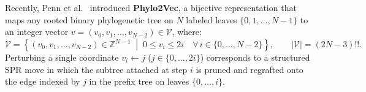 \documentclass[11pt,a4paper]{article}
\makeatletter
\DeclareRobustCommand{\_}{\ifmmode\nfss@text{\textunderscore}\else\textunderscore\allowbreak\fi}
\theoremstyle{definition}
\makeatother
\begin{document}
Recently, Penn et al.~\cite{penn2024phylo2vec} introduced \textbf{Phylo2Vec}, a bijective representation that maps any rooted binary phylogenetic tree on $N$ labeled leaves $\{0, 1, \dots, N-1\}$ to an integer vector $v = (v_0, v_1, \dots, v_{N-2}) \in \mathcal{V}$, where:
\begin{equation}
\mathcal{V} = \left\{ (v_0, v_1, \dots, v_{N-2}) \in \mathbb{Z}^{N-1} \;\middle|\; 0 \le v_i \le 2i \quad \forall \, i \in \{0, \dots, N-2\} \right\}, \qquad |\mathcal{V}| = (2N-3)!!.
\label{eq:phylo2vec_space}
\end{equation}
Perturbing a single coordinate $v_i \leftarrow j$ ($j \in \{0, \dots, 2i\}$) corresponds to a structured SPR move in which the subtree attached at step $i$ is pruned and regrafted onto the edge indexed by $j$ in the prefix tree on leaves $\{0, \dots, i\}$.
\end{document}
